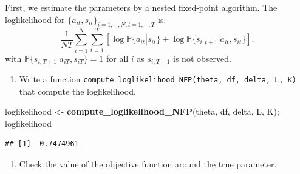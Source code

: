 \documentclass[]{book}
\newenvironment{Shaded}{\begin{snugshade}}{\end{snugshade}}
\newcommand{\KeywordTok}[1]{\textcolor[rgb]{0.13,0.29,0.53}{\textbf{#1}}}
\newcommand{\StringTok}[1]{\textcolor[rgb]{0.31,0.60,0.02}{#1}}
\newcommand{\NormalTok}[1]{#1}
\providecommand{\tightlist}{%
  \setlength{\itemsep}{0pt}\setlength{\parskip}{0pt}}
\begin{document}
First, we estimate the parameters by a nested fixed-point algorithm. The
loglikelihood for
\(\{a_{it}, s_{it}\}_{i = 1, \cdots, N, t = 1, \cdots, T}\) is: \[
\frac{1}{NT} \sum_{i = 1}^N \sum_{t = 1}^T[\log\mathbb{P}\{a_{it}|s_{it}\} + \log \mathbb{P}\{s_{i, t + 1}|a_{it}, s_{it}\}],
\] with \(\mathbb{P}\{s_{i, T + 1}|a_{iT}, s_{iT}\} = 1\) for all \(i\)
as \(s_{i, T + 1}\) is not observed.

\begin{enumerate}
\def\labelenumi{\arabic{enumi}.}
\setcounter{enumi}{1}
\tightlist
\item
  Write a function
  \texttt{compute\_loglikelihood\_NFP(theta,\ df,\ delta,\ L,\ K)} that
  compute the loglikelihood.
\end{enumerate}

\begin{Shaded}
\begin{Highlighting}[]
\NormalTok{loglikelihood <-}\StringTok{ }\KeywordTok{compute_loglikelihood_NFP}\NormalTok{(theta, df, delta, L, K); loglikelihood}
\end{Highlighting}
\end{Shaded}

\begin{verbatim}
## [1] -0.7474961
\end{verbatim}

\begin{enumerate}
\def\labelenumi{\arabic{enumi}.}
\setcounter{enumi}{2}
\tightlist
\item
  Check the value of the objective function around the true parameter.
\end{enumerate}
\end{document}
